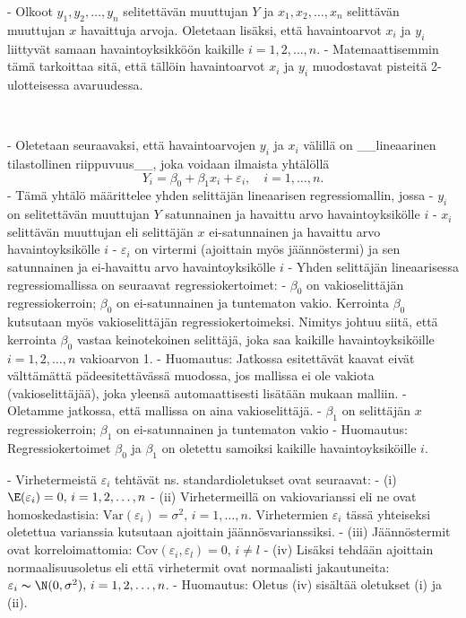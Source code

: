 \documentclass[
]{book}
\begin{document}
\begin{itemize}
- Olkoot $y_1, y_2,\ldots, y_n$ selitettävän muuttujan $Y$ ja $x_1, x_2, \ldots, x_n$ selittävän muuttujan $x$ havaittuja arvoja. Oletetaan lisäksi, että havaintoarvot $x_i$ ja $y_i$ liittyvät
samaan havaintoyksikköön kaikille $i=1, 2, \ldots, n$. 
  - Matemaattisemmin tämä tarkoittaa sitä, että tällöin havaintoarvot $x_i$ ja $y_i$ muodostavat pisteitä 2-ulotteisessa avaruudessa.

\
\

- Oletetaan seuraavaksi, että havaintoarvojen $y_i$ ja $x_i$ välillä on __lineaarinen tilastollinen riippuvuus__, joka voidaan ilmaista yhtälöllä
$$
Y_i = \beta_0 + \beta_1 x_i + \varepsilon_i, \quad i=1,\ldots, n.
$$
- Tämä yhtälö määrittelee yhden selittäjän lineaarisen regressiomallin, jossa
  - $y_i$ on selitettävän muuttujan $Y$ satunnainen ja havaittu arvo havaintoyksikölle $i$
  - $x_i$ selittävän muuttujan eli selittäjän $x$ ei-satunnainen ja havaittu arvo havaintoyksikölle $i$
  - $\varepsilon_i$ on virtermi (ajoittain myös jäännöstermi) ja sen satunnainen ja ei-havaittu arvo havaintoyksikölle $i$
- Yhden selittäjän lineaarisessa regressiomallissa on seuraavat regressiokertoimet:
  - $\beta_0$ on vakioselittäjän regressiokerroin; $\beta_0$ on ei-satunnainen ja tuntematon vakio. Kerrointa $\beta_0$ kutsutaan myös vakioselittäjän regressiokertoimeksi. Nimitys johtuu siitä, että kerrointa $\beta_0$ vastaa keinotekoinen selittäjä, joka saa kaikille havaintoyksiköille $i=1, 2, \ldots, n$ vakioarvon 1.
    - Huomautus: Jatkossa esitettävät kaavat eivät välttämättä pädeesitettävässä muodossa, jos mallissa ei ole vakiota (vakioselittäjää), joka yleensä automaattisesti lisätään mukaan malliin.
    - Oletamme jatkossa, että mallissa on aina vakioselittäjä.
  - $\beta_1$ on selittäjän $x$ regressiokerroin; $\beta_1$ on ei-satunnainen ja tuntematon vakio
    - Huomautus: Regressiokertoimet $\beta_0$ ja $\beta_1$ on oletettu samoiksi kaikille havaintoyksiköille $i$. 

- Virhetermeistä $\varepsilon_i$ tehtävät ns. standardioletukset ovat seuraavat:
  - (i) $\E(\varepsilon_i) = 0, \, i=1,2,\ldots,n$
  - (ii) Virhetermeillä on vakiovarianssi eli ne ovat homoskedastisia: $\mathrm{Var}(\varepsilon_i)= \sigma^2, \, i=1,\ldots,n$. Virhetermien $\varepsilon_i$ tässä yhteiseksi oletettua varianssia kutsutaan ajoittain jäännösvarianssiksi.
  - (iii) Jäännöstermit ovat korreloimattomia: $\mathrm{Cov}(\varepsilon_i, \varepsilon_l)=0, \, i \neq l$
  - (iv) Lisäksi tehdään ajoittain normaalisuusoletus eli että virhetermit ovat normaalisti jakautuneita: $\varepsilon_i \thicksim \N(0, \sigma^2), \, i=1,2,\ldots,n$.
    - Huomautus: Oletus (iv) sisältää oletukset (i) ja (ii).


\end{itemize}
\end{document}
